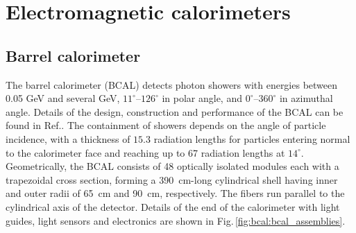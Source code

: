 \section[Electromagnetic calorimeters (Elton/Colin)] {Electromagnetic calorimeters \label{sec:calorimeters}}

\subsection[Barrel calorimeter ]{Barrel calorimeter \label{sec:bcal}}

The barrel calorimeter (BCAL) detects photon showers with energies between 0.05 GeV and several GeV, $11^{\circ}$--$126^{\circ}$ in polar angle, and $0^{\circ}$--$360^{\circ}$ in azimuthal angle. Details of the design, construction and performance of the BCAL can be found in Ref.\cite{BEATTIE201824}. The containment of showers depends on the angle of particle incidence, with a thickness of $15.3$ radiation lengths for particles entering normal to the calorimeter face and reaching up to 67 radiation lengths at $14^{\circ}$. Geometrically, the BCAL consists of 48 optically isolated modules each with a trapezoidal cross section, forming a  390~cm-long cylindrical shell having inner and outer radii of 65~cm and 90~cm, respectively. The fibers run parallel to the cylindrical axis of the detector.  Details of the end of the calorimeter with light guides, light sensors and electronics are shown in  Fig.\,\ref{fig:bcal:bcal_assemblies}.

